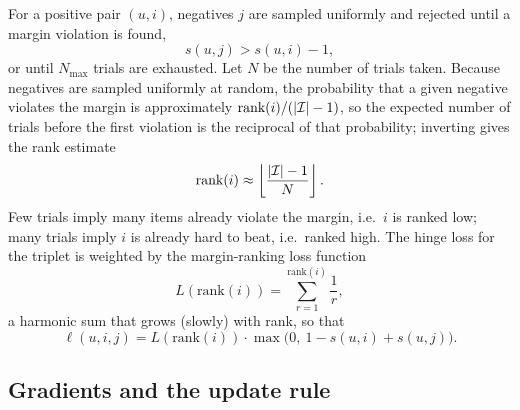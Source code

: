 For a positive pair $(u, i)$, negatives $j$ are sampled uniformly and
rejected until a margin violation is found,
\begin{equation}
  s(u, j) > s(u, i) - 1 ,
\end{equation}
or until $N_{\max}$ trials are exhausted. Let $N$ be the number of trials
taken. Because negatives are sampled uniformly at random, the probability
that a given negative violates the margin is approximately
$\text{rank}(i) / (|\mathcal{I}| - 1)$, so the expected number of trials before
the first violation is the reciprocal of that probability; inverting gives
the rank estimate
\begin{equation}
  \text{rank}(i) \approx \left\lfloor \frac{|\mathcal{I}| - 1}{N} \right\rfloor .
  \label{eq:rank-estimate}
\end{equation}
Few trials imply many items already violate the margin, i.e.\ $i$ is ranked
low; many trials imply $i$ is already hard to beat, i.e.\ ranked high. The
hinge loss for the triplet is weighted by the margin-ranking loss function
\begin{equation}
  L(\text{rank}(i)) = \sum_{r=1}^{\text{rank}(i)} \frac{1}{r} ,
  \label{eq:warp-weight}
\end{equation}
a harmonic sum that grows (slowly) with rank, so that
\begin{equation}
  \ell(u, i, j) = L(\text{rank}(i)) \cdot \max\!\big(0,\ 1 - s(u,i) + s(u,j)\big) .
  \label{eq:warp-loss}
\end{equation}

\subsection{Gradients and the update rule}

